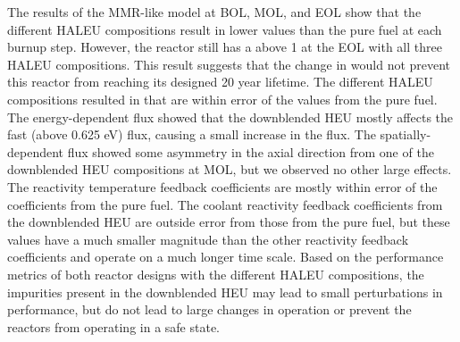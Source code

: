 The results of the \gls{MMR}-like model at \gls{BOL}, \gls{MOL}, 
and \gls{EOL} show that the different \gls{HALEU} compositions 
result in lower \keff values than the pure fuel at each burnup 
step. However, 
the reactor still has a \keff above 1 at the \gls{EOL} with all 
three \gls{HALEU} compositions. 
This result suggests that the change in \keff would not prevent this 
reactor from reaching its designed 20 year lifetime. The 
different \gls{HALEU} compositions resulted in \betaEff that 
are within error of the values from the pure fuel. The 
energy-dependent 
flux showed that the downblended \gls{HEU} mostly affects 
the fast (above 0.625 eV) flux, causing a small increase in 
the flux. The spatially-dependent flux showed some 
asymmetry in the axial direction from one of the downblended 
\gls{HEU} compositions at \gls{MOL}, but we observed no other large 
effects. The reactivity temperature feedback coefficients 
are mostly within error of the coefficients from the pure fuel. 
The coolant reactivity feedback coefficients from the downblended 
\gls{HEU} are outside error from those from the pure fuel, 
but these values have a much smaller magnitude than the other 
reactivity feedback coefficients and operate on a much 
longer time scale. Based on the performance metrics of 
both reactor designs with the different \gls{HALEU} 
compositions, the impurities present in the downblended 
\gls{HEU} may lead to small perturbations in performance, but do 
not lead to large changes in operation or prevent the 
reactors from operating in a safe state. 
 
